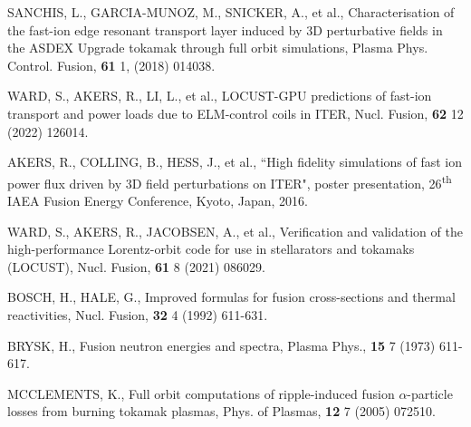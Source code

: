 \documentclass[10pt, a4paper, twoside]{article}
\begin{document}
\begin{thebibliography}{9}
    SANCHIS, L., GARCIA-MUNOZ, M., SNICKER, A., et al.,
    Characterisation of the fast-ion edge resonant transport layer induced by 3D perturbative fields in the ASDEX Upgrade tokamak through full orbit simulations,
    Plasma Phys. Control. Fusion,
    \textbf{61} 1,
    (2018)
    014038.
    
    WARD, S., AKERS, R., LI, L., et al.,
    LOCUST-GPU predictions of fast-ion transport and power loads due to ELM-control coils in ITER,
    Nucl. Fusion,
    \textbf{62} 12
    (2022)
    126014.

    AKERS, R., COLLING, B., HESS, J., et al.,
    ``High fidelity simulations of fast ion power flux driven by 3D field perturbations on ITER",
    poster presentation, 
    26\textsuperscript{th} IAEA Fusion Energy Conference,
    Kyoto, Japan, 
    2016.

    WARD, S., AKERS, R., JACOBSEN, A., et al.,
    Verification and validation of the high-performance Lorentz-orbit code for use in stellarators and tokamaks (LOCUST),
    Nucl. Fusion,
    \textbf{61} 8
    (2021)
    086029.

    BOSCH, H., HALE, G.,
    Improved formulas for fusion cross-sections and thermal reactivities,
    Nucl. Fusion,
    \textbf{32} 4
    (1992)
    611-631.

    BRYSK, H.,
    Fusion neutron energies and spectra,
    Plasma Phys.,
    \textbf{15} 7
    (1973)
    611-617.

    MCCLEMENTS, K.,
    Full orbit computations of ripple-induced fusion $\alpha$-particle losses from burning tokamak plasmas,
    Phys. of Plasmas,
    \textbf{12} 7
    (2005)
    072510.


\end{thebibliography}
\end{document}
